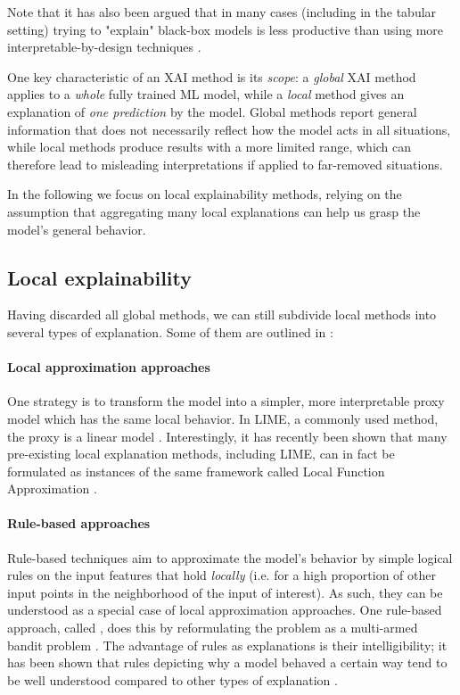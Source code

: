 \documentclass[../main.tex]{subfiles}
\begin{document}
Note that it has also been argued that in many cases (including in the tabular setting) trying to "explain" black-box models is less productive than using more interpretable-by-design techniques \cite{rudinWhy2019}.

One key characteristic of an XAI method is its \emph{scope}: a \emph{global} XAI method applies to a \emph{whole} fully trained ML model, while a \emph{local} method gives an explanation of \emph{one prediction} by the model.
Global methods report general information that does not necessarily reflect
how the model acts in all situations, while local methods produce results with
a more limited range, which can therefore lead to misleading interpretations if applied to far-removed situations.


In the following we focus on local explainability methods, relying on the assumption that aggregating many local explanations can help us grasp the model's general behavior.

\subsection{Local explainability}

Having discarded all global methods, we can still subdivide local methods into several types of explanation. Some of them are outlined in \cite{bellePrinciples2021}:

\paragraph{Local approximation approaches}

One strategy is to transform the model into a simpler, more interpretable proxy model which has the same local behavior. In LIME, a commonly used method, the proxy is a linear model \cite{ribeiroWhy2016}.
Interestingly, it has recently been shown that many pre-existing local explanation methods, including LIME, can in fact be formulated as instances of the same framework called Local Function Approximation \cite{hanWhich2022}.

\paragraph{Rule-based approaches}

Rule-based techniques aim to approximate the model's behavior by simple logical rules on the input features that hold \emph{locally} (i.e. for a high proportion of other input points in the neighborhood of the input of interest).
As such, they can be understood as a special case of local approximation approaches.
One rule-based approach, called , does this by reformulating the problem as a multi-armed bandit problem \cite{ribeiroAnchors2018}.
The advantage of rules as explanations is their intelligibility; it has been shown that rules depicting why a model behaved a certain way tend to be well understood compared to other types of explanation \cite{limWhy2009}.
\end{document}

